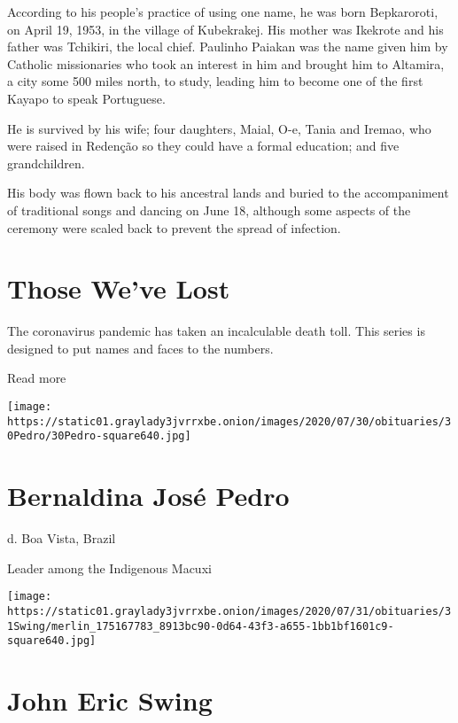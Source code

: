 According to his people's practice of using one name, he was born
Bepkaroroti, on April 19, 1953, in the village of Kubekrakej. His mother
was Ikekrote and his father was Tchikiri, the local chief. Paulinho
Paiakan was the name given him by Catholic missionaries who took an
interest in him and brought him to Altamira, a city some 500 miles
north, to study, leading him to become one of the first Kayapo to speak
Portuguese.

He is survived by his wife; four daughters, Maial, O-e, Tania and
Iremao, who were raised in Redenção so they could have a formal
education; and five grandchildren.

His body was flown back to his ancestral lands and buried to the
accompaniment of traditional songs and dancing on June 18, although some
aspects of the ceremony were scaled back to prevent the spread of
infection.

\href{https://www.nytimes3xbfgragh.onion/interactive/2020/obituaries/people-died-coronavirus-obituaries.html?action=click\&pgtype=Article\&state=default\&region=BELOW_MAIN_CONTENT\&context=covid_obits_promo}{}

\hypertarget{those-weve-lost}{%
\section{Those We've Lost}\label{those-weve-lost}}

The coronavirus pandemic has taken an incalculable death toll. This
series is designed to put names and faces to the numbers.

Read more

\texttt{[image: https://static01.graylady3jvrrxbe.onion/images/2020/07/30/obituaries/30Pedro/30Pedro-square640.jpg]}

\hypertarget{bernaldina-josuxe9-pedro}{%
\section{Bernaldina José Pedro}\label{bernaldina-josuxe9-pedro}}

d. Boa Vista, Brazil

Leader among the Indigenous Macuxi

\texttt{[image: https://static01.graylady3jvrrxbe.onion/images/2020/07/31/obituaries/31Swing/merlin\_175167783\_8913bc90-0d64-43f3-a655-1bb1bf1601c9-square640.jpg]}

\hypertarget{john-eric-swing}{%
\section{John Eric Swing}\label{john-eric-swing}}

